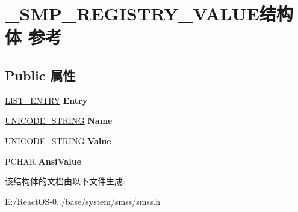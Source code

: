 \hypertarget{struct___s_m_p___r_e_g_i_s_t_r_y___v_a_l_u_e}{}\section{\+\_\+\+S\+M\+P\+\_\+\+R\+E\+G\+I\+S\+T\+R\+Y\+\_\+\+V\+A\+L\+U\+E结构体 参考}
\label{struct___s_m_p___r_e_g_i_s_t_r_y___v_a_l_u_e}
\subsection*{Public 属性}
\begin{DoxyCompactItemize}
\item 
\mbox{\label{struct___s_m_p___r_e_g_i_s_t_r_y___v_a_l_u_e_a56c638e6608200e9873fd1c42042ed33}} 
\hyperlink{struct___l_i_s_t___e_n_t_r_y}{L\+I\+S\+T\+\_\+\+E\+N\+T\+RY} {\bfseries Entry}
\item 
\mbox{\label{struct___s_m_p___r_e_g_i_s_t_r_y___v_a_l_u_e_a040d09f49f87f849fa0615c485b93fe2}} 
\hyperlink{struct___u_n_i_c_o_d_e___s_t_r_i_n_g}{U\+N\+I\+C\+O\+D\+E\+\_\+\+S\+T\+R\+I\+NG} {\bfseries Name}
\item 
\mbox{\label{struct___s_m_p___r_e_g_i_s_t_r_y___v_a_l_u_e_ad145a0f0a7e3227c2b99e965ace2ae28}} 
\hyperlink{struct___u_n_i_c_o_d_e___s_t_r_i_n_g}{U\+N\+I\+C\+O\+D\+E\+\_\+\+S\+T\+R\+I\+NG} {\bfseries Value}
\item 
\mbox{\label{struct___s_m_p___r_e_g_i_s_t_r_y___v_a_l_u_e_a9d259df678b8c10d38b8a42e305b5fb2}} 
P\+C\+H\+AR {\bfseries Ansi\+Value}
\end{DoxyCompactItemize}


该结构体的文档由以下文件生成\+:\begin{DoxyCompactItemize}
\item 
E\+:/\+React\+O\+S-\/0../base/system/smss/smss.\+h\end{DoxyCompactItemize}
